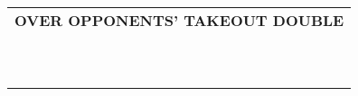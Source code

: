 \documentclass{article}
\begin{document}
{\begin{minipage}{90mm}
\begin{tabular}{| p{88mm} |}
		\\ \hline
		\\ \hline
		\textbf{OVER OPPONENTS' TAKEOUT DOUBLE} \\ \hline
		\\ \hline
		\\ \hline
		\\ \hline
		\\ \hline
		\\ \hline
		\\ \hline
		\\ \hline
		\\ \hline
		\\ \hline
		\\ \hline
	\end{tabular}
\end{minipage}
}
\begin{minipage}{5mm}
	\begin{tabular}{| p{5mm} |}
	\end{tabular}
\end{minipage}
\end{document}
